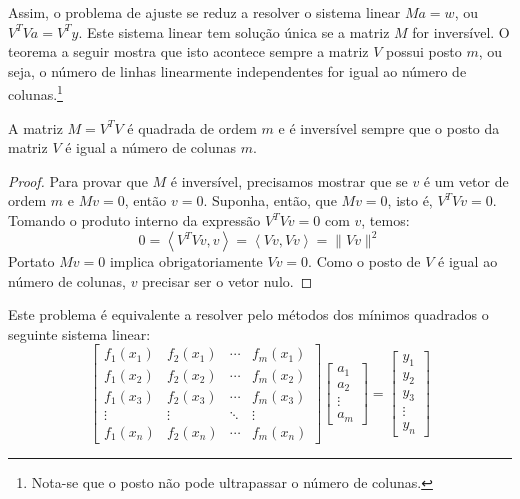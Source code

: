 Assim, o problema de ajuste se reduz a resolver o sistema linear $Ma=w$, ou $V^TVa = V^T y$. Este sistema linear tem solução única se a matriz $M$ for inversível. O teorema a seguir mostra que isto acontece sempre a matriz $V$ possui posto $m$, ou seja, o número de linhas linearmente independentes for igual ao número de colunas.\footnote{Nota-se que o posto não pode ultrapassar o número de colunas.}


\begin{teo}
A matriz $M=V^TV$ é quadrada de ordem $m$ e é inversível sempre que o posto da matriz $V$ é igual a número de colunas $m$.
\end{teo}
\begin{proof}
Para provar que $M$ é inversível, precisamos mostrar que se $v$ é um vetor de ordem $m$ e $Mv=0$, então $v=0$. Suponha, então, que $Mv=0$, isto é, 
$V^TVv=0$. Tomando o produto interno da expressão $V^TVv=0$ com $v$, temos:
$$0=\left<V^TVv,v\right>=\left<Vv,Vv\right>=\|Vv\|^2$$
Portato $Mv=0$ implica obrigatoriamente $Vv=0$. Como o posto de $V$ é igual ao número de colunas, $v$ precisar ser o vetor nulo.
\end{proof}

\begin{obs} Este problema é equivalente a resolver pelo métodos dos mínimos quadrados o seguinte sistema linear:
  \begin{equation*}
    \begin{bmatrix}
      f_1(x_1)&f_2(x_1) & \cdots & f_m(x_1)\\
      f_1(x_2)&f_2(x_2) & \cdots & f_m(x_2)\\
      f_1(x_3)&f_2(x_3) & \cdots & f_m(x_3)\\
      \vdots & \vdots & \ddots & \vdots\\
      f_1(x_n)&f_2(x_n) & \cdots & f_m(x_n)
    \end{bmatrix}
    \begin{bmatrix}
      a_1\\
      a_2\\
      \vdots\\
      a_m
    \end{bmatrix}
    =\begin{bmatrix}
      y_1\\
      y_2\\
      y_3\\
      \vdots\\
      y_n
    \end{bmatrix}
  \end{equation*}
\end{obs}


